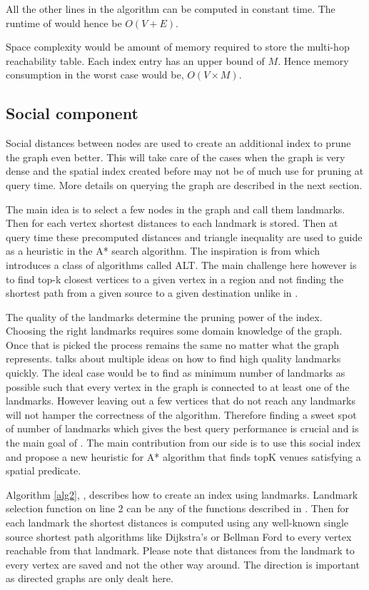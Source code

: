 All the other lines in the algorithm can be computed in constant time. The runtime of {\grpspatial} would hence be $O(V + E)$.

Space complexity would be amount of memory required to store the multi-hop reachability table. Each index entry has an upper bound of $M$. Hence memory consumption in the worst case would be, $O(V \times M)$.

\subsection{Social component}
Social distances between nodes are used to create an additional index to prune the graph even better. This will take care of the cases when the graph is very dense and the spatial index created before may not be of much use for pruning at query time. More details on querying the graph are described in the next section.

The main idea is to select a few nodes in the graph and call them landmarks. Then for each vertex shortest distances to each landmark is stored. Then at query time these precomputed distances and triangle inequality are used to guide as a heuristic in the A* search algorithm. The inspiration is from \cite{AC2005} which introduces a class of algorithms called ALT. The main challenge here however is to find top-k closest vertices to a given vertex in a region and not finding the shortest path from a given source to a given destination unlike in \cite{AC2005}.

The quality of the landmarks determine the pruning power of the index. Choosing the right landmarks requires some domain knowledge of the graph. Once that is picked the process remains the same no matter what the graph represents. \cite{AC2005} talks about multiple ideas on how to find high quality landmarks quickly. The ideal case would be to find as minimum number of landmarks as possible such that every vertex in the graph is connected to at least one of the landmarks.  However leaving out a few vertices that do not reach any landmarks will not hamper the correctness of the algorithm. Therefore finding a sweet spot of number of landmarks which gives the best query performance is crucial and is the main goal of \cite{AC2005}. The main contribution from our side is to use this social index and propose a new heuristic for A* algorithm that finds topK venues satisfying a spatial predicate.

Algorithm \ref{alg2}, {\grpsocial}, describes how to create an index using landmarks. Landmark selection function on line 2 can be any of the functions described in \cite{AC2005}. Then for each landmark the shortest distances is computed using any well-known single source shortest path algorithms like Dijkstra's or Bellman Ford to every vertex reachable from that landmark. Please note that distances from the landmark to every vertex are saved and not the other way around. The direction is important as directed graphs are only dealt here.

